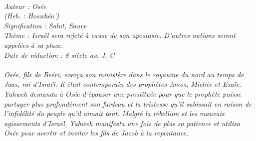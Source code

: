 \BFont
\noindent\hrulefill
{\footnotesize
\textit{
\bigskip
{\centering{}
\\Auteur : Osée
\\(Heb. : Hoswhéa')
\\Signification : Salut, Sauve
\\Thème : Israël sera rejeté à cause de son apostasie. D'autres nations seront appelées à sa place.
\\Date de rédaction : 8 siècle av. J.-C\\}
}
\textit{
\\Osée, fils de Beéri, exerça son ministère dans le royaume du nord au temps de Joas, roi d'Israël. Il était contemporain des prophètes Amos, Michée et Esaïe.
\\Yahweh demanda à Osée d'épouser une prostituée pour que le prophète puisse partager plus profondément son fardeau
et la tristesse qu'il subissait en raison de l'infidélité du peuple qu'il aimait tant. Malgré la rébellion et les mauvais
agissements d'Israël, Yahweh manifesta une fois de plus sa patience et utilisa Osée pour avertir et inviter les fils de Jacob à la repentance.\bigskip
}
}
\par\nobreak\noindent\hrulefill
